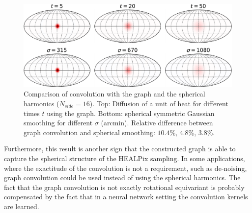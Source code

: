 \documentclass[final,twocolumn,3p,times,sort&compress]{elsarticle}
\newcommand{\nati}[1]{{\color[rgb]{.1,.6,.1}{#1}}}
\newcommand{\todo}[1]{{\color[rgb]{.6,.1,.6}{#1}}}
\newcommand{\1}{\b{1}}              %
\newcommand{\0}{\b{0}}              %
\begin{document}
\begin{figure}
  \centering
  \includegraphics[width=\linewidth]{gaussian_filters_sphere}
  \caption{Comparison of convolution with the graph and the spherical harmonics ($N_{side} = 16$).
  Top: Diffusion of a unit of heat for different times $t$ using the graph.
  Bottom: spherical symmetric Gaussian smoothing for different $\sigma$ (arcmin).
  Relative difference between graph convolution and spherical smoothing: $10.4$\%, $4.8$\%, $3.8$\%.
}
  \label{fig:gaussian_filters_comparizon}
\end{figure}

Furthermore, this result is another sign that the constructed graph is able to capture the spherical
structure of the HEALPix sampling. In some applications, where the
exactitude of the convolution is not a requirement, such as de-noising, graph convolution could be used instead of using the spherical harmonics.
The fact that the graph convolution is not exactly rotational equivariant is probably compensated by the fact that in a neural network setting the convolution kernels are learned.
\todo{not ideal tho as the graph convolution depends on the localization}

\end{document}
